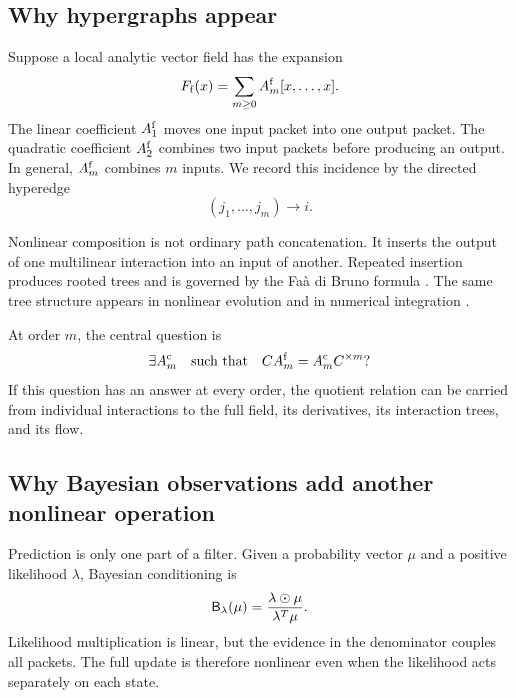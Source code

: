 \subsection{Why hypergraphs appear}
Suppose a local analytic vector field has the expansion
\begin{equation}\label{PRIQ:eq:analytic-expansion-intro}
  F_{\mathrm f}(x)=\sum_{m\geq0}A_m^{\mathrm f}[x,\ldots,x].
\end{equation}
The linear coefficient $A_1^{\mathrm f}$ moves one input packet into one output packet.  The quadratic coefficient $A_2^{\mathrm f}$ combines two input packets before producing an output.  In general, $A_m^{\mathrm f}$ combines $m$ inputs.  We record this incidence by the directed hyperedge
\[
  (j_1,\ldots,j_m)\longrightarrow i.
\]

Nonlinear composition is not ordinary path concatenation.  It inserts the output of one multilinear interaction into an input of another.  Repeated insertion produces rooted trees and is governed by the Fa\`a di Bruno formula \cite{PRIQ:ConstantineSavits1996}.  The same tree structure appears in nonlinear evolution and in numerical integration \cite{PRIQ:Butcher1972,PRIQ:HairerLubichWanner2006}.

At order $m$, the central question is
\begin{equation}\label{PRIQ:eq:arity-question}
  \exists A_m^{\mathrm c}
  \quad\text{such that}\quad
  C A_m^{\mathrm f}=A_m^{\mathrm c}C^{\times m}?
\end{equation}
If this question has an answer at every order, the quotient relation can be carried from individual interactions to the full field, its derivatives, its interaction trees, and its flow.

\subsection{Why Bayesian observations add another nonlinear operation}
Prediction is only one part of a filter.  Given a probability vector $\mu$ and a positive likelihood $\lambda$, Bayesian conditioning is
\begin{equation}\label{PRIQ:eq:bayes-intro}
  \mathsf B_{\lambda}(\mu)
  =
  \frac{\lambda\odot\mu}{\lambda^T\mu}.
\end{equation}
Likelihood multiplication is linear, but the evidence in the denominator couples all packets.  The full update is therefore nonlinear even when the likelihood acts separately on each state.


